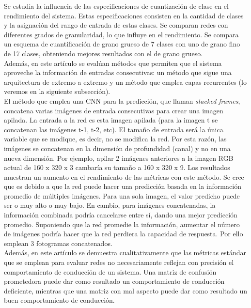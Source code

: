 Se estudia la influencia de las especificaciones de cuantización de clase en el rendimiento del sistema. Estas especificaciones consisten en la cantidad de clases y la asignación del rango de entrada de estas clases. Se comparan redes con diferentes grados de granularidad, lo que influye en el rendimiento. Se compara un esquema de cuantificación de grano grueso de 7 clases con uno de grano fino de 17 clases, obteniendo mejores resultados con el de grano grueso.\\

Además, en este artículo se evalúan métodos que permiten que el sistema aproveche la información de entradas consecutivas: un método que sigue una arquitectura de extremo a extremo y un método que emplea capas recurrentes (lo veremos en la siguiente subsección). \\

El método que emplea una CNN para la predicción, que llaman \textit{stacked frames}, concatena varias imágenes de entrada consecutivas para crear una imagen apilada. La entrada a la red es esta imagen apilada (para la imagen t se concatenan las imágenes t-1, t-2, etc). El tamaño de entrada será la única variable que se modique, es decir, no se modifica la red. Por esta razón, las imágenes se concatenan en la dimensión de profundidad (canal) y no en una nueva dimensión. Por ejemplo, apilar 2 imágenes anteriores a la imagen RGB actual de 160 x 320 x 3 cambaría su tamaño a 160 x 320 x 9. Los resultados muestran un aumento en el rendimiento de las métricas con este método. Se cree que es debido a que la red puede hacer una predicción basada en la información promedio de múltiples imágenes. Para una sola imagen, el valor predicho puede ser o muy alto o muy bajo. En cambio, para imágenes concatenadas, la información combinada podría cancelarse entre sí, dando una mejor predicción promedio. Suponiendo que la red promedie la información, aumentar el número de imágenes podría hacer que la red perdiera la capacidad de respuesta. Por ello emplean 3 fotogramas concatenados.\\

Además, en este artículo se demuestra cualitativamente que las métricas estándar que se emplean para evaluar redes no necesariamente reflejan con precisión el comportamiento de conducción de un sistema. Una matriz de confusión prometedora puede dar como resultado un comportamiento de conducción deficiente, mientras que una matriz con mal aspecto puede dar como resultado un buen comportamiento de conducción.



